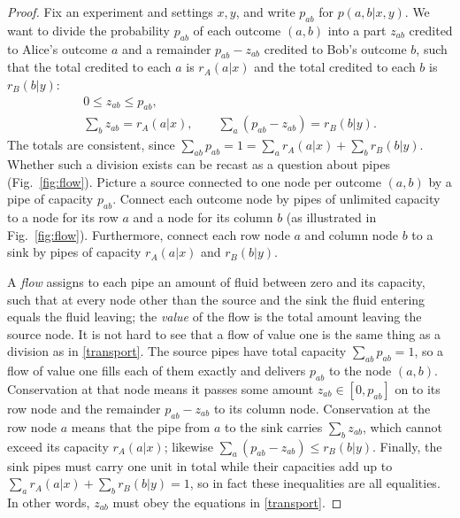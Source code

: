 \documentclass[aps,prl,reprint,superscriptaddress,nofootinbib,longbibliography,raggedbottom]{revtex4-2}
\begin{document}
\begin{proof}
Fix an experiment and settings $x,y$, and write $p_{ab}$ for
$p(a,b|x,y)$. We want to divide the probability $p_{ab}$ of each outcome
$(a,b)$ into a part $z_{ab}$ credited to Alice's outcome $a$ and a
remainder $p_{ab}-z_{ab}$ credited to Bob's outcome $b$, such that the
total credited to each $a$ is $r_A(a|x)$ and the total credited to each
$b$ is $r_B(b|y)$:
\begin{equation}\label{transport}
\begin{gathered}
0\leq z_{ab}\leq p_{ab},\\
\sum_b z_{ab}=r_A(a|x),\qquad \sum_a(p_{ab}-z_{ab})=r_B(b|y).
\end{gathered}
\end{equation}
The totals are consistent, since
$\sum_{ab}p_{ab}=1=\sum_ar_A(a|x)+\sum_br_B(b|y)$. Whether such a division
exists can be recast as a question about pipes (Fig.~\ref{fig:flow}).
Picture a source connected to one node per outcome $(a,b)$ by a pipe of
capacity $p_{ab}$. Connect each outcome node by pipes of unlimited capacity
to a node for its row $a$ and a node for its column $b$ (as illustrated in Fig.~\ref{fig:flow}). Furthermore, connect each row node
$a$ and column node $b$ to a sink by pipes of capacity
$r_A(a|x)$ and $r_B(b|y)$. 

A \emph{flow} assigns to each pipe an amount of fluid between zero and
its capacity, such that at every node other than the source and the sink
the fluid entering equals the fluid leaving; the \emph{value} of the flow is the total
amount leaving the source node. It is not hard to see that a flow of value one is the same thing as a
division as in \eqref{transport}. The source pipes have total capacity
$\sum_{ab}p_{ab}=1$, so a flow of value one fills each of them exactly and
delivers $p_{ab}$ to the node $(a,b)$. Conservation at that node means it
passes some amount $z_{ab}\in[0,p_{ab}]$ on to its row node and the
remainder $p_{ab}-z_{ab}$ to its column node. Conservation at the row node
$a$ means that the pipe from $a$ to the sink carries $\sum_bz_{ab}$, which
cannot exceed its capacity $r_A(a|x)$; likewise
$\sum_a(p_{ab}-z_{ab})\leq r_B(b|y)$. Finally, the sink pipes must carry
one unit in total while their capacities add up to
$\sum_ar_A(a|x)+\sum_br_B(b|y)=1$, so in fact these inequalities are all
equalities. In other words, $z_{ab}$ must obey the equations in \eqref{transport}.


\end{proof}
\end{document}
